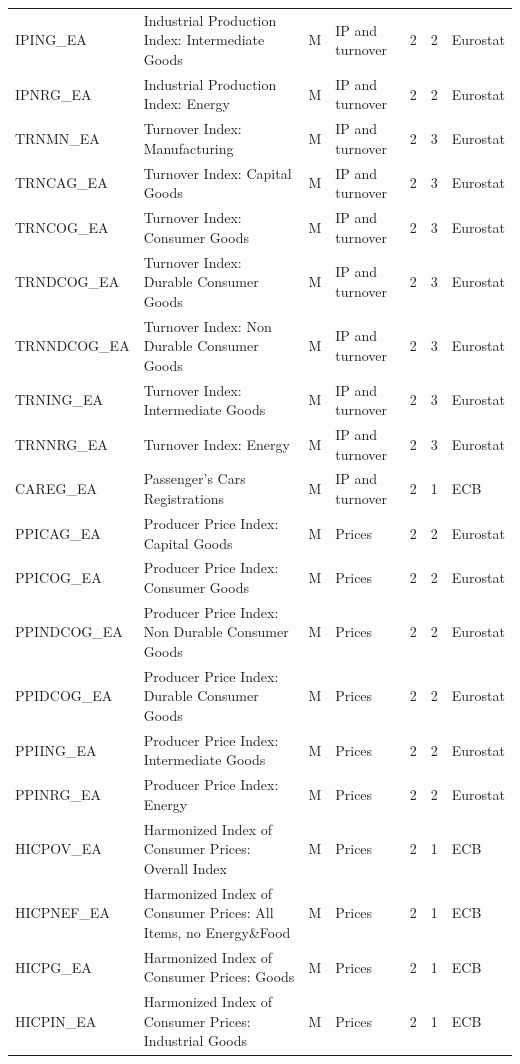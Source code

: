 \begin{longtable}{@{}l>{\raggedright\arraybackslash}p{7.4cm}clrr>{\raggedright\arraybackslash}p{2.6cm}@{}}
IPING\_EA & Industrial Production Index: Intermediate Goods & M & IP and turnover & 2 & 2 & Eurostat \\
IPNRG\_EA & Industrial Production Index: Energy & M & IP and turnover & 2 & 2 & Eurostat \\
TRNMN\_EA & Turnover Index: Manufacturing & M & IP and turnover & 2 & 3 & Eurostat \\
TRNCAG\_EA & Turnover Index: Capital Goods & M & IP and turnover & 2 & 3 & Eurostat \\
TRNCOG\_EA & Turnover Index: Consumer Goods & M & IP and turnover & 2 & 3 & Eurostat \\
TRNDCOG\_EA & Turnover Index: Durable Consumer Goods & M & IP and turnover & 2 & 3 & Eurostat \\
TRNNDCOG\_EA & Turnover Index: Non Durable Consumer Goods & M & IP and turnover & 2 & 3 & Eurostat \\
TRNING\_EA & Turnover Index: Intermediate Goods & M & IP and turnover & 2 & 3 & Eurostat \\
TRNNRG\_EA & Turnover Index: Energy & M & IP and turnover & 2 & 3 & Eurostat \\
CAREG\_EA & Passenger’s Cars Registrations & M & IP and turnover & 2 & 1 & ECB \\
PPICAG\_EA & Producer Price Index: Capital Goods & M & Prices & 2 & 2 & Eurostat \\
PPICOG\_EA & Producer Price Index: Consumer Goods & M & Prices & 2 & 2 & Eurostat \\
PPINDCOG\_EA & Producer Price Index: Non Durable Consumer Goods & M & Prices & 2 & 2 & Eurostat \\
PPIDCOG\_EA & Producer Price Index: Durable Consumer Goods & M & Prices & 2 & 2 & Eurostat \\
PPIING\_EA & Producer Price Index: Intermediate Goods & M & Prices & 2 & 2 & Eurostat \\
PPINRG\_EA & Producer Price Index: Energy & M & Prices & 2 & 2 & Eurostat \\
HICPOV\_EA & Harmonized Index of Consumer Prices: Overall Index & M & Prices & 2 & 1 & ECB \\
HICPNEF\_EA & Harmonized Index of Consumer Prices: All Items, no Energy\&Food & M & Prices & 2 & 1 & ECB \\
HICPG\_EA & Harmonized Index of Consumer Prices: Goods & M & Prices & 2 & 1 & ECB \\
HICPIN\_EA & Harmonized Index of Consumer Prices: Industrial Goods & M & Prices & 2 & 1 & ECB \\

\end{longtable}
